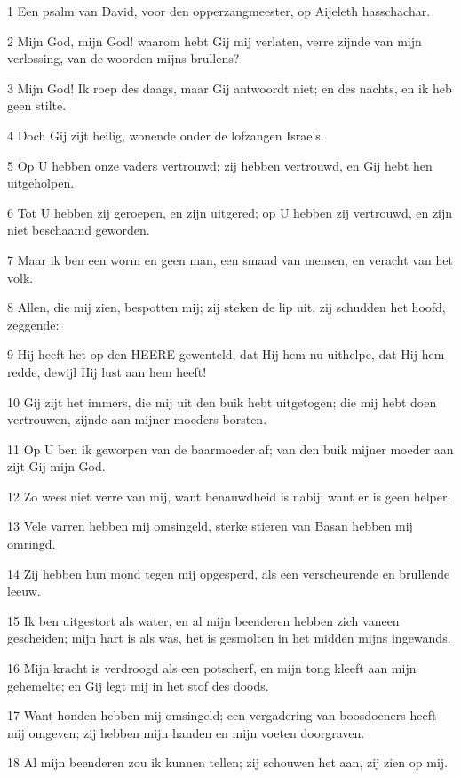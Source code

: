 \par 1 Een psalm van David, voor den opperzangmeester, op Aijeleth hasschachar.
\par 2 Mijn God, mijn God! waarom hebt Gij mij verlaten, verre zijnde van mijn verlossing, van de woorden mijns brullens?
\par 3 Mijn God! Ik roep des daags, maar Gij antwoordt niet; en des nachts, en ik heb geen stilte.
\par 4 Doch Gij zijt heilig, wonende onder de lofzangen Israels.
\par 5 Op U hebben onze vaders vertrouwd; zij hebben vertrouwd, en Gij hebt hen uitgeholpen.
\par 6 Tot U hebben zij geroepen, en zijn uitgered; op U hebben zij vertrouwd, en zijn niet beschaamd geworden.
\par 7 Maar ik ben een worm en geen man, een smaad van mensen, en veracht van het volk.
\par 8 Allen, die mij zien, bespotten mij; zij steken de lip uit, zij schudden het hoofd, zeggende:
\par 9 Hij heeft het op den HEERE gewenteld, dat Hij hem nu uithelpe, dat Hij hem redde, dewijl Hij lust aan hem heeft!
\par 10 Gij zijt het immers, die mij uit den buik hebt uitgetogen; die mij hebt doen vertrouwen, zijnde aan mijner moeders borsten.
\par 11 Op U ben ik geworpen van de baarmoeder af; van den buik mijner moeder aan zijt Gij mijn God.
\par 12 Zo wees niet verre van mij, want benauwdheid is nabij; want er is geen helper.
\par 13 Vele varren hebben mij omsingeld, sterke stieren van Basan hebben mij omringd.
\par 14 Zij hebben hun mond tegen mij opgesperd, als een verscheurende en brullende leeuw.
\par 15 Ik ben uitgestort als water, en al mijn beenderen hebben zich vaneen gescheiden; mijn hart is als was, het is gesmolten in het midden mijns ingewands.
\par 16 Mijn kracht is verdroogd als een potscherf, en mijn tong kleeft aan mijn gehemelte; en Gij legt mij in het stof des doods.
\par 17 Want honden hebben mij omsingeld; een vergadering van boosdoeners heeft mij omgeven; zij hebben mijn handen en mijn voeten doorgraven.
\par 18 Al mijn beenderen zou ik kunnen tellen; zij schouwen het aan, zij zien op mij.
